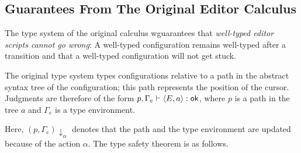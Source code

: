 \documentclass[sigplan]{acmart}
\begin{document}

\subsection{Guarantees From The Original Editor Calculus}

The type system of the original calculus
\cite{type_safe_structure_editor} wguarantees that \emph{well-typed
  editor scripts cannot go wrong}: A well-typed configuration remains
well-typed after a transition and that a well-typed configuration will
not get stuck.

The original type system types configurations relative to a
path in the abstract syntax tree of the configuration; this path
represents the position of the cursor. Judgments are therefore of the
form $p, \Gamma_e \vdash \langle E,a \rangle : \textsf{ok}$, where $p$ is a path
in the tree $a$ and $\Gamma_e$ is a type environment.

Here, $(p,\Gamma_e)\downarrow_\alpha$ denotes that the path and the
type environment are updated because of the action $\alpha$. The type
safety theorem is as follows.
\end{document}
